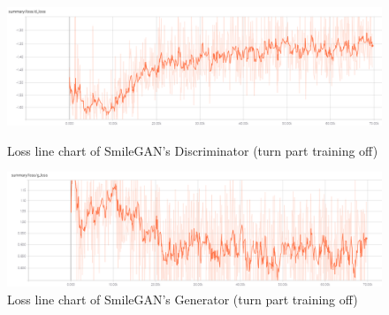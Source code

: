 \begin{figure}
    \begin{minipage}[t]{0.49\linewidth}
        \centering
        \includegraphics[width=\textwidth]{figures/loss_part_off_d.png}
        \caption{Loss line chart of SmileGAN's Discriminator (turn part training off)}
        \label{loss_part_off_d}
    \end{minipage}
        \hfill
    \begin{minipage}[t]{0.49\linewidth}
        \centering
        \includegraphics[width=\textwidth]{figures/loss_part_off_g.png}
        \caption{Loss line chart of SmileGAN's Generator (turn part training off)}
        \label{loss_part_off_g}
    \end{minipage}
\end{figure}

